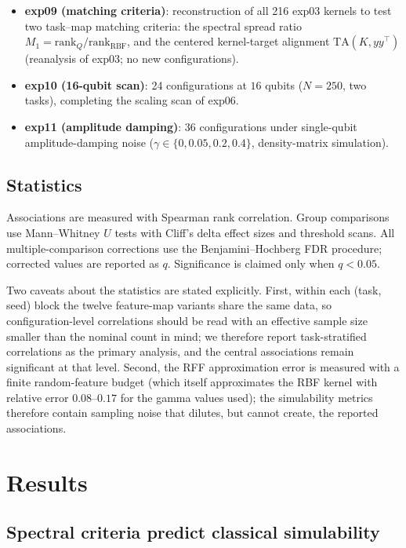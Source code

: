 \documentclass[a4paper,unpublished,onecolumn,nopdfoutputerror,12pt]{quantumarticle}
\begin{document}
\begin{itemize}
($p\in\{0,0.02,0.1,0.3\}$, density-matrix simulation at 5 qubits).
\item \textbf{exp09 (matching criteria)}: reconstruction of all 216 exp03 kernels to
test two task--map matching criteria: the spectral spread ratio
$M_1=\mathrm{rank}_Q/\mathrm{rank}_{\mathrm{RBF}}$, and the centered kernel-target
alignment $\mathrm{TA}(K,yy^{\top})$ (reanalysis of exp03; no new configurations).
\item \textbf{exp10 (16-qubit scan)}: 24 configurations at $16$ qubits ($N=250$,
two tasks), completing the scaling scan of exp06.
\item \textbf{exp11 (amplitude damping)}: 36 configurations under single-qubit
amplitude-damping noise ($\gamma\in\{0,0.05,0.2,0.4\}$, density-matrix simulation).
\end{itemize}

\subsection{Statistics}
\label{sec:methods-stats}

Associations are measured with Spearman rank correlation. Group comparisons use
Mann--Whitney $U$ tests with Cliff's delta effect sizes and threshold scans. All
multiple-comparison corrections use the Benjamini--Hochberg FDR procedure; corrected
values are reported as $q$. Significance is claimed only when $q<0.05$.

Two caveats about the statistics are stated explicitly. First, within each
(task, seed) block the twelve feature-map variants share the same data, so
configuration-level correlations should be read with an effective sample size
smaller than the nominal count in mind; we therefore report task-stratified
correlations as the primary analysis, and the central associations remain
significant at that level. Second, the RFF approximation error is measured with
a finite random-feature budget (which itself approximates the RBF kernel with
relative error $0.08$--$0.17$ for the gamma values used); the simulability
metrics therefore contain sampling noise that dilutes, but cannot create,
the reported associations.

\section{Results}
\label{sec:results}

\subsection{Spectral criteria predict classical simulability}
\label{sec:simulability}
\end{document}
